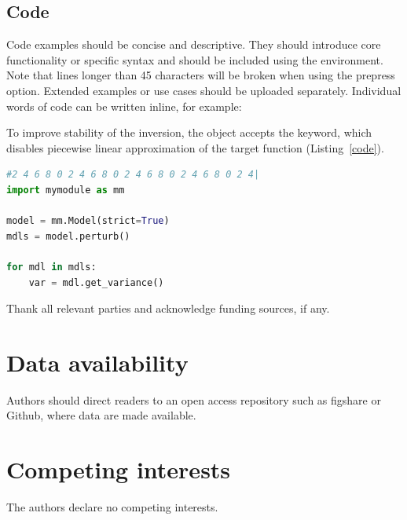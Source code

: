 \documentclass[report,breakmath]{seismica}
\begin{document}
	\subsection{Code}

Code examples should be concise and descriptive. They should introduce core functionality or specific syntax and should be included using the  environment. Note that lines longer than 45 characters will be broken when using the prepress option. Extended examples or use cases should be uploaded separately. Individual words of code can be written inline, for example:

To improve stability of the inversion, the  object accepts the  keyword, which disables piecewise linear approximation of the target function (Listing~\ref{code}).

\begin{lstlisting}[caption=Example use of \code{Model}, label=code, language=Python]
#2 4 6 8 0 2 4 6 8 0 2 4 6 8 0 2 4 6 8 0 2 4|
import mymodule as mm

model = mm.Model(strict=True)
mdls = model.perturb()

for mdl in mdls:
	var = mdl.get_variance()
\end{lstlisting}

\begin{acknowledgements}
	Thank all relevant parties and acknowledge funding sources, if any.
\end{acknowledgements}
	
\section*{Data availability}
Authors should direct readers to an open access repository such as figshare or Github, where data are made available.

\section*{Competing interests}
The authors declare no competing interests.

 
	
\end{document}
